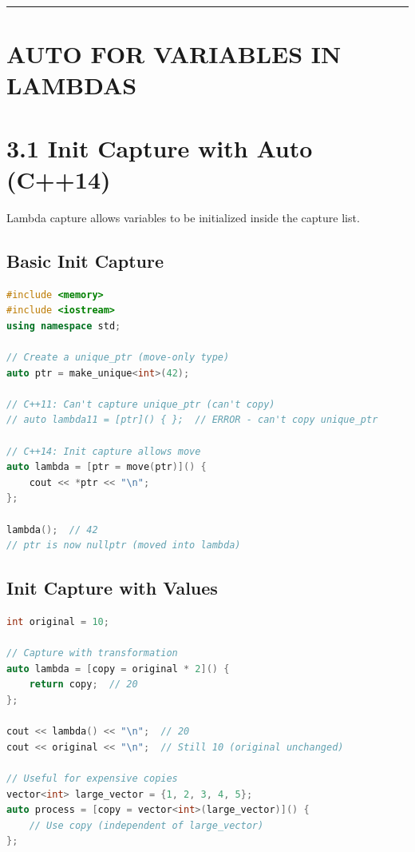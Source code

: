 \begin{center}\rule{0.5\linewidth}{0.5pt}\end{center}

\hypertarget{auto-for-variables-in-lambdas}{%
\section{AUTO FOR VARIABLES IN
LAMBDAS}\label{auto-for-variables-in-lambdas}}

\hypertarget{init-capture-with-auto-c14}{%
\section{3.1 Init Capture with Auto
(C++14)}\label{init-capture-with-auto-c14}}

Lambda capture allows variables to be initialized inside the capture
list.

\hypertarget{basic-init-capture}{%
\subsection{Basic Init Capture}\label{basic-init-capture}}

\begin{lstlisting}[language={C++}]
#include <memory>
#include <iostream>
using namespace std;

// Create a unique_ptr (move-only type)
auto ptr = make_unique<int>(42);

// C++11: Can't capture unique_ptr (can't copy)
// auto lambda11 = [ptr]() { };  // ERROR - can't copy unique_ptr

// C++14: Init capture allows move
auto lambda = [ptr = move(ptr)]() {
    cout << *ptr << "\n";
};

lambda();  // 42
// ptr is now nullptr (moved into lambda)
\end{lstlisting}

\hypertarget{init-capture-with-values}{%
\subsection{Init Capture with Values}\label{init-capture-with-values}}

\begin{lstlisting}[language={C++}]
int original = 10;

// Capture with transformation
auto lambda = [copy = original * 2]() {
    return copy;  // 20
};

cout << lambda() << "\n";  // 20
cout << original << "\n";  // Still 10 (original unchanged)

// Useful for expensive copies
vector<int> large_vector = {1, 2, 3, 4, 5};
auto process = [copy = vector<int>(large_vector)]() {
    // Use copy (independent of large_vector)
};
\end{lstlisting}

